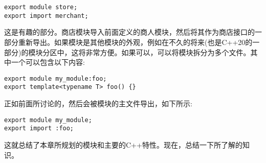 \begin{lstlisting}[style=styleCXX]
export module store;
export import merchant;
\end{lstlisting}

这是有趣的部分。商店模块导入前面定义的商人模块，然后将其作为商店接口的一部分重新导出。如果模块是其他模块的外观，例如在不久的将来(也是C++20的一部分)的模块分区中，这将非常方便。如果可以，可以将模块拆分为多个文件。其中一个可以包含以下内容:

\begin{lstlisting}[style=styleCXX]
export module my_module:foo;
export template<typename T> foo() {}
\end{lstlisting}

正如前面所讨论的，然后会被模块的主文件导出，如下所示:

\begin{lstlisting}[style=styleCXX]
export module my_module;
export import :foo;
\end{lstlisting}

这就总结了本章所规划的模块和主要的C++特性。现在，总结一下所了解的知识。






